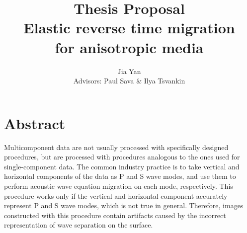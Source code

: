 \title{\textbf{Thesis Proposal} \\ 
\LARGE{Elastic reverse time migration\\ for anisotropic media}}
\author{\large\textup{ Jia Yan}\\ Advisors: Paul Sava \& Ilya Tsvankin}









\tableofcontents
\newpage



\def\CURL#1{\nabla \times {#1}}
\def\GRAD#1{\nabla {#1}}
\def\DIV#1{\nabla \cdot {#1}}
\def\LAPL#1{\nabla^2 {#1}}

\def\uu{\mathbf u}

\def\xx{ x,z}
\def\ofx { \lp \xx   \rp}
\def\ofxt{ \lp \xx,t \rp}

\def\IM#1{  {I}_{#1} \ofx }
\def\US#1{{u_s}_{#1} \ofxt}
\def\UR#1{{u_r}_{#1} \ofxt}

\def\P#1{ P_{#1} \ofxt }
\def\S#1{ S_{#1} \ofxt }
%



\section{Abstract}
Multicomponent data are not usually processed with specifically designed procedures, but are processed with procedures analogous to the ones used for single-component data. The common industry practice is to take vertical and horizontal components of the data as P and S wave modes, and use them to perform acoustic wave equation migration on each mode, respectively. This procedure works only if the vertical and horizontal component accurately represent P and S wave modes, which is not true in general. Therefore, images constructed with this procedure contain artifacts caused by the incorrect representation of wave separation on the surface.

